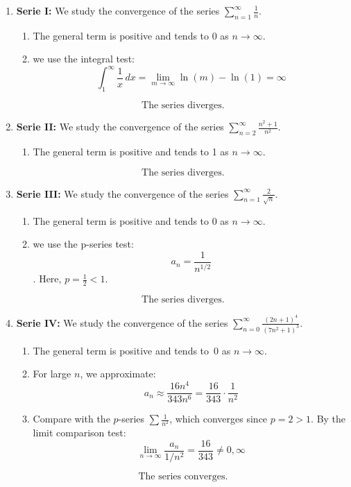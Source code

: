 \documentclass[12pt]{article}
\begin{document}
\begin{correctionbox}
\begin{enumerate}
    \item \textbf{Serie I:} We study the convergence of the series $\sum_{n=1}^{\infty} \frac{1}{n}$.
    \begin{enumerate}
        \item The general term is positive and tends to 0 as $n \to \infty$.
        \item we use the integral test: \[\int_{1}^{\infty} \frac{1}{x} \, dx = \lim_{m \to \infty} \ln(m) - \ln(1) = \infty\]
    \end{enumerate}
    \[\boxed{\text{The series diverges.}}\]

    \item \textbf{Serie II:} We study the convergence of the series $\sum_{n=2}^{\infty} \frac{n^2 + 1}{n^2}$.
    \begin{enumerate}
        \item The general term is positive and tends to 1 as $n \to \infty$.
    \end{enumerate}
    \[\boxed{\text{The series diverges.}}\]  
    
    \item \textbf{Serie III:} We study the convergence of the series $\sum_{n=1}^{\infty} \frac{2}{\sqrt{n}}$.
    \begin{enumerate}
        \item The general term is positive and tends to 0 as $n \to \infty$.
        \item we use the p-series test: \[a_n = \frac{1}{n^{1/2}}\]. Here, $p = \frac{1}{2} < 1$.
    \end{enumerate}
    \[\boxed{\text{The series diverges.}}\]

    \item \textbf{Serie IV:} We study the convergence of the series $\sum_{n=0}^{\infty} \frac{(2n + 1)^4}{(7n^2 + 1)^3}$.
    \begin{enumerate}
        \item  The general term is positive and tends to~0 as $n \to \infty$.
        \item  For large $n$, we approximate:
    \[a_n \approx \frac{16n^4}{343n^6} = \frac{16}{343}\cdot\frac{1}{n^2}\]
        \item Compare with the $p$-series $\displaystyle \sum \frac{1}{n^2}$, which converges since $p = 2 > 1$.
    By the limit comparison test:
    \[\lim_{n \to \infty} \frac{a_n}{1/n^2} = \frac{16}{343} \neq 0,\infty\]
    \end{enumerate}
    \[\boxed{\text{The series converges.}}\]


\end{enumerate}
\end{correctionbox}
\end{document}
